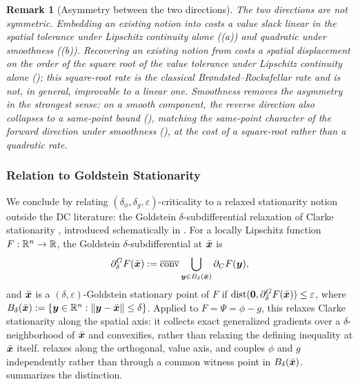 \documentclass[english]{article}
\newtheorem{remark}{Remark}[section]
\begin{document}
\begin{remark}[Asymmetry between the two directions]
The two directions are not symmetric. Embedding an existing notion into
 costs a value slack linear in the spatial
tolerance under Lipschitz continuity alone ((a))
and quadratic under smoothness ((b)). Recovering
an existing notion from  costs a spatial
displacement on the order of the square root of the value tolerance under
Lipschitz continuity alone (); this square-root
rate is the classical Brøndsted--Rockafellar rate and is not, in general,
improvable to a linear one. Smoothness removes the asymmetry in the
strongest sense: on a smooth component, the reverse direction also
collapses to a same-point bound (), matching the
same-point character of the forward direction under smoothness
(), at the cost of a square-root rather than a
quadratic rate.
\end{remark}

\subsubsection{Relation to Goldstein Stationarity}

We conclude by relating $(\delta_\phi,\delta_g,\varepsilon)$-criticality to
a relaxed stationarity notion outside the DC literature: the Goldstein
$\delta$-subdifferential relaxation of Clarke stationarity
\citep{goldstein1977optimization,Zhang-2020-Complexity}, introduced
schematically in . For a
locally Lipschitz function $F:\mathbb{R}^n\to\mathbb{R}$, the Goldstein
$\delta$-subdifferential at $\bar{\bm{x}}$ is
\[
    \partial_\delta^G F(\bar{\bm{x}})
    :=
    \overline{\operatorname{conv}}
    \bigcup_{\bm{y}\in B_\delta(\bar{\bm{x}})}
    \partial_C F(\bm{y}),
\]
and $\bar{\bm{x}}$ is a $(\delta,\varepsilon)$-Goldstein stationary point of $F$
if $\operatorname{dist}(\bm{0},\partial_\delta^G F(\bar{\bm{x}}))\le\varepsilon$,
where $B_\delta(\bar{\bm{x}}):=\{\bm{y}\in\mathbb{R}^n:\|\bm{y}-\bar{\bm{x}}\|\le\delta\}$.
Applied to $F=\Psi=\phi-g$, this relaxes Clarke stationarity along the
spatial axis: it collects exact generalized gradients over a
$\delta$-neighborhood of $\bar{\bm{x}}$ and convexifies, rather than relaxing
the defining inequality at $\bar{\bm{x}}$ itself. 
relaxes along the orthogonal, value axis, and couples $\phi$ and $g$
independently rather than through a common witness point in
$B_\delta(\bar{\bm{x}})$.  summarizes the
distinction.
\end{document}
